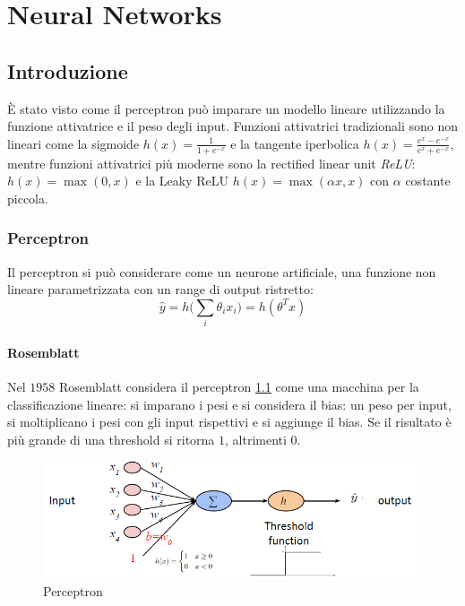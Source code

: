 \chapter{Neural Networks}

\section{Introduzione}
\`E stato visto come il perceptron pu\`o imparare un modello lineare utilizzando la funzione attivatrice e il peso degli input.
Funzioni attivatrici tradizionali sono non lineari come la sigmoide $h(x) = \frac{1}{1+e^{-x}}$ e la tangente iperbolica $h(x) = \frac{e^x-e^{-x}}{e^x+e^{-x}}$, mentre funzioni attivatrici pi\`u moderne sono la rectified linear unit \emph{ReLU}: $h(x) = \max(0,x)$ e la Leaky ReLU $h(x) = \max(\alpha x,x)$ con $\alpha$ costante piccola.

\subsection{Perceptron}
Il perceptron si pu\`o considerare come un neurone artificiale, una funzione non lineare parametrizzata con un range di output ristretto:
$$\hat{y} = h\bigl(\sum\limits_i\theta_ix_i\bigr) = h(\theta^Tx)$$

\subsubsection{Rosemblatt}
Nel $1958$ Rosemblatt considera il perceptron \ref{fig:chapter11-00} come una macchina per la classificazione lineare: si imparano i pesi e si considera il bias: un peso per input, si moltiplicano i pesi con gli input rispettivi e si aggiunge il bias.
Se il risultato \`e pi\`u grande di una threshold si ritorna $1$, altrimenti $0$.

\begin{figure}
	\centering
	\includegraphics[width=0.6\linewidth]{imgs/chapter11/img0}
	\caption{Perceptron}
	\label{fig:chapter11-00}
\end{figure}

